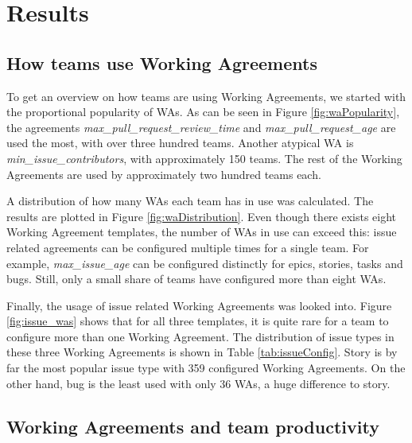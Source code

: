 
\chapter{Results}

\section{How teams use Working Agreements}


To get an overview on how teams are using Working Agreements, we started with the proportional popularity of WAs. As can be seen in Figure \ref{fig:waPopularity}, the agreements \textit{max\_pull\_request\_review\_time} and \textit{max\_pull\_request\_age} are used the most, with over three hundred teams. Another atypical WA is \textit{min\_issue\_contributors}, with approximately 150 teams. The rest of the Working Agreements are used by approximately two hundred teams each.



A distribution of how many WAs each team has in use was calculated. The results are plotted in Figure \ref{fig:waDistribution}. Even though there exists eight Working Agreement templates, the number of WAs in use can exceed this: issue related agreements can be configured multiple times for a single team. For example, \textit{max\_issue\_age} can be configured distinctly for epics, stories, tasks and bugs. Still, only a small share of teams have configured more than eight WAs.



Finally, the usage of issue related Working Agreements was looked into. Figure \ref{fig:issue_was} shows that for all three templates, it is quite rare for a team to configure more than one Working Agreement. The distribution of issue types in these three Working Agreements is shown in Table \ref{tab:issueConfig}. Story is by far the most popular issue type with 359 configured Working Agreements. On the other hand, bug is the least used with only 36 WAs, a huge difference to story.





\section{Working Agreements and team productivity}

